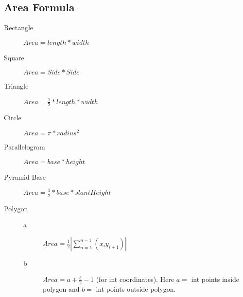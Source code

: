 \documentclass[10pt, a4paper]{article}
\begin{document}
\begin{multicols}{2}
\subsection{Area Formula}
\begin{description}
    \item[Rectangle] 
        \begin{math}
            Area = length * width
        \end{math}
    \item[Square] 
        \begin{math}
            Area = Side * Side
        \end{math}
    \item[Triangle] 
        \begin{math}
            Area = \frac{1}{2} * length * width
        \end{math}
    \item[Circle] 
        \begin{math}
            Area = \pi * radius^2
        \end{math}
    \item[Parallelogram] 
        \begin{math}
            Area = base * height
        \end{math}
    \item[Pyramid Base] 
        \begin{math}
            Area = \frac{1}{2} * base * slantHeight
        \end{math}
    \item[Polygon] \hfill
        \begin{description}
            \item[a] 
            \begin{math}
                Area = \frac{1}{2}|\sum_{n=1}^{n-1}(x_iy_{i+1})|
            \end{math}

            \item[b] 
            \begin{math}
                Area = a + \frac{b}{2} - 1
            \end{math}
            (for int coordinates). Here $a=$ int points inside polygon and $b=$ int points outside polygon. 
        \end{description}
        
\end{description}

\end{multicols}
\end{document}
